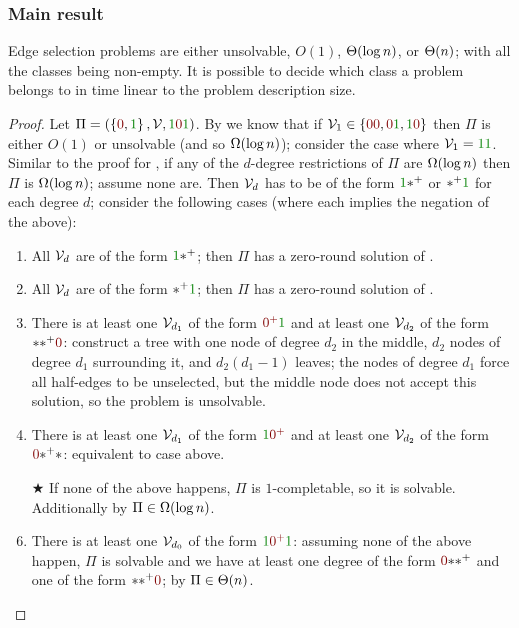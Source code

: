 \documentclass[12pt,a4paper]{article}
\begin{document}
\subsubsection{Main result}
\begin{thm}\label{thm:es}
    Edge selection problems are either unsolvable, $O(1)$, $\Theta(\log n)$, or $\Theta(n)$; with all the classes being non-empty. It is possible to decide which class a problem belongs to in time linear to the problem description size.
\end{thm}
\begin{proof}
    Let $\Pi=(\Set{\n,\y},\Vc,\y\n\y)$. By  we know that if $\Vc_1\in\Set{\n\n,\n\y,\y\n}$ then $\Pi$ is either $O(1)$ or unsolvable (and so $\Omega(\log n)$); consider the case where $\Vc_1=\y\y$. Similar to the proof for , if any of the $d$-degree restrictions of $\Pi$ are $\Omega(\log n)$ then $\Pi$ is $\Omega(\log n)$; assume none are. Then $\mathcal{V}_d$ has to be of the form $\y\xpl$ or $\xpl\y$ for each degree $d$; consider the following cases (where each implies the negation of the above):
    \begin{enumerate}
        \item All $\mathcal{V}_d$ are of the form $\y\xpl$; then $\Pi$ has a zero-round solution of .
        \item All $\mathcal{V}_d$ are of the form $\xpl\y$; then $\Pi$ has a zero-round solution of .
        \item There is at least one $\mathcal{V}_{d_1}$ of the form $\npl\y$ and at least one $\mathcal{V}_{d_2}$ of the form $\x\xpl\n$: construct a tree with one node of degree $d_2$ in the middle, $d_2$ nodes of degree $d_1$ surrounding it, and $d_2(d_1-1)$ leaves; the nodes of degree $d_1$ force all half-edges to be unselected, but the middle node does not accept this solution, so the problem is unsolvable.
        \item There is at least one $\mathcal{V}_{d_1}$ of the form $\y\npl$ and at least one $\mathcal{V}_{d_2}$ of the form $\n\xpl\x$: equivalent to case above.
        \item[$\bigstar$] If none of the above happens, $\Pi$ is $1$-completable, so it is solvable. Additionally by  $\Pi\in\Omega(\log n)$.
        \item There is at least one $\mathcal{V}_{d_0}$ of the form $\y\npl\y$: assuming none of the above happen, $\Pi$ is solvable and we have at least one degree of the form $\n\x\xpl$ and one of the form $\x\xpl\n$; by  $\Pi\in\Theta(n)$.

\end{enumerate}
\end{proof}
\end{document}
